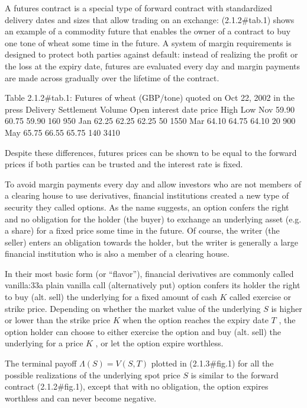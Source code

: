 A futures contract is a special type of forward contract with standardized delivery dates and sizes that allow trading on an exchange: (2.1.2#tab.1) shows an example of a commodity future that enables the owner of a contract to buy one tone of wheat some time in the future. A system of margin requirements is designed to protect both parties against default: instead of realizing the profit or the loss at the expiry date, futures are evaluated every day and margin payments are made across gradually over the lifetime of the contract. 

Table 2.1.2#tab.1: Futures of wheat (GBP/tone) quoted on Oct 22, 2002 in the press
Delivery	 Settlement		 Volume	 Open interest
date	 price	 High	 Low		
Nov	 59.90	 60.75	 59.90	 160	 950
Jan	 62.25	 62.25	 62.25	 50	 1550
Mar	 64.10	 64.75	 64.10	 20	 900
May	 65.75	 66.55	 65.75	 140	 3410

Despite these differences, futures prices can be shown to be equal to the forward prices if both parties can be trusted and the interest rate is fixed.



To avoid margin payments every day and allow investors who are not members of a clearing house to use derivatives, financial institutions created a new type of security they called options. As the name suggests, an option confers the right and no obligation for the holder (the buyer) to exchange an underlying asset (e.g. a share) for a fixed price some time in the future. Of course, the writer (the seller) enters an obligation towards the holder, but the writer is generally a large financial institution who is also a member of a clearing house.

In their most basic form (or ``flavor''), financial derivatives are commonly called vanilla:33a plain vanilla call (alternatively put) option confers its holder the right to buy (alt. sell) the underlying for a fixed amount of cash $ K$ called exercise or strike price. Depending on whether the market value of the underlying $ S$ is higher or lower than the strike price $ K$ when the option reaches the expiry date $ T$ , the option holder can choose to either exercise the option and buy (alt. sell) the underlying for a price $ K$ , or let the option expire worthless.

The terminal payoff  $ \Lambda (S)=V(S,T)$ plotted in (2.1.3#fig.1) for all the possible realizations of the underlying spot price $ S$ is similar to the forward contract (2.1.2#fig.1), except that with no obligation, the option expires worthless and can never become negative.

